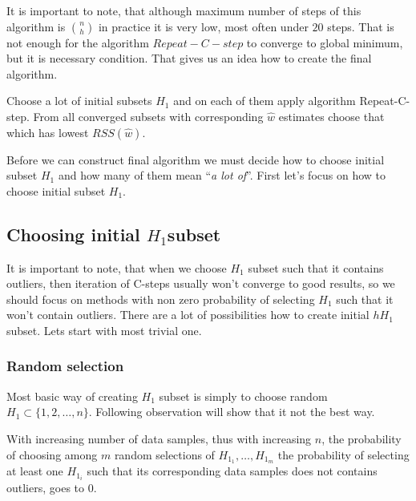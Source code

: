It is important to note, that although maximum number of steps of this algorithm is ${n \choose h}$ in practice it is very low, most often under $20$ steps.
That is not enough for the algorithm $Repeat-C-step$ to converge to global minimum, but it is necessary condition. That gives us an idea how to create the final algorithm. \cite{rouss:2000}

Choose a lot of initial subsets $H_1$ and on each of them apply algorithm Repeat-C-step. From all converged subsets with corresponding $\hat{w}$ estimates choose that which has lowest $RSS(\hat{w})$. 

Before we can construct final algorithm we must decide how to choose initial subset $H_1$ and how many of them mean ``\emph{a lot of}''. First let's focus on how to choose initial subset $H_1$.


\subsection{Choosing initial $H_1$subset}

It is important to note, that when we choose $H_1$ subset such that it contains outliers, then iteration of  C-steps
usually won't converge to good results, so we should focus on methods with non zero probability of selecting $H_1$ such that it won't contain outliers.
There are a lot of possibilities how to create initial $hH_1$ subset. Lets start with most trivial one.


\subsubsection{Random selection}
Most basic way of creating $H_1$ subset is simply to choose random $H_1 \subset \{{1,2,\ldots , n\}}$. Following observation will show that it not the best way.

\begin{observation} \label{hrandomsamples}
	With increasing number of data samples, thus with increasing $n$, the probability of choosing among $m$ random selections of $H_{1_1}, \ldots ,H_{1_m}$ the probability of selecting
	at least one $H_{1_i}$ such that its corresponding data samples does not contains outliers, goes to $0$.
\end{observation}

